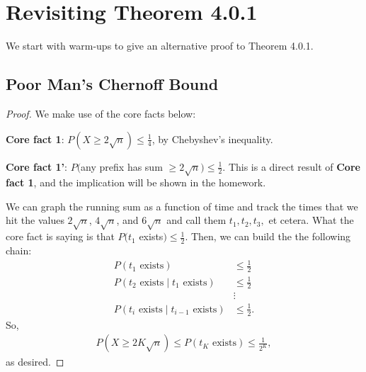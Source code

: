 \documentclass{report}
\begin{document}
\newpage
\section{Revisiting Theorem 4.0.1}
We start with warm-ups to give an alternative proof to Theorem 4.0.1.

\subsection{Poor Man's Chernoff Bound}
\begin{proof} We make use of the core facts below:

    \noindent\textbf{Core fact 1}: $P(X \geq 2\sqrt n) \leq \frac{1}{4}$, by Chebyshev's inequality.

    \noindent\textbf{Core fact 1'}: $P($any prefix has sum $\geq 2 \sqrt n) \leq \frac 12$. This is a direct result of \textbf{Core fact 1}, and the implication will be shown in the homework. 
    
    We can graph the running sum as a function of time and track the times that we hit the values $2\sqrt n$, $4 \sqrt n$, and $6\sqrt n$ and call them $t_1, t_2, t_3,$ et cetera. What the core fact is saying is that $P(t_1$ exists$) \leq \frac 12$. Then, we can build the the following chain:
    \begin{align*}
        P(t_1 \text{ exists}) &\leq \frac 12 \\
        P(t_2 \text{ exists} \mid t_1 \text{ exists}) &\leq \frac 12 \\
        &\vdots \\
        P(t_i \text{ exists} \mid t_{i-1} \text{ exists}) &\leq \frac 12.
    \end{align*}
    So, 
    \begin{align*}
        P(X \geq 2K \sqrt n) \leq P(t_K \text{ exists}) \leq \frac{1}{2^K},
    \end{align*}
    as desired.
\end{proof}
\end{document}
